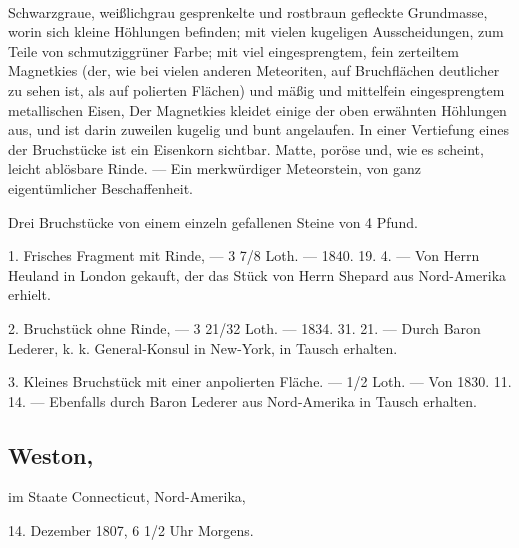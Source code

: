 \documentclass[a4paper, 11pt, oneside, polutonikogreek, german]{article}
\begin{document}
\paragraph{}
Schwarzgraue, weißlichgrau gesprenkelte und rostbraun gefleckte Grundmasse, worin sich kleine Höhlungen befinden; mit vielen kugeligen Ausscheidungen, zum Teile von schmutziggrüner Farbe; mit viel eingesprengtem, fein zerteiltem Magnetkies (der, wie bei vielen anderen Meteoriten, auf Bruchflächen deutlicher zu sehen ist, als auf polierten Flächen) und mäßig und mittelfein eingesprengtem metallischen Eisen, Der Magnetkies kleidet einige der oben erwähnten Höhlungen aus, und ist darin zuweilen kugelig und bunt angelaufen. In einer Vertiefung eines der Bruchstücke ist ein Eisenkorn sichtbar. Matte, poröse und, wie es scheint, leicht ablösbare Rinde. — Ein merkwürdiger Meteorstein, von ganz eigentümlicher Beschaffenheit.

Drei Bruchstücke von einem einzeln gefallenen Steine von 4 Pfund.

1. Frisches Fragment mit Rinde, — 3 7/8 Loth. — 1840. 19. 4. — Von Herrn Heuland in London gekauft, der das Stück von Herrn Shepard aus Nord-Amerika erhielt.

2. Bruchstück ohne Rinde, — 3 21/32 Loth. — 1834. 31. 21. — Durch Baron Lederer, k. k. General-Konsul in New-York, in Tausch erhalten.

3. Kleines Bruchstück mit einer anpolierten Fläche. — 1/2 Loth. — Von 1830. 11. 14. — Ebenfalls durch Baron Lederer aus Nord-Amerika in Tausch erhalten.
\subsection[Weston.]{Weston,}
\begin{center}
\small
im Staate Connecticut, Nord-Amerika,

14. Dezember 1807, 6 1/2 Uhr Morgens.
\end{center}
\end{document}
